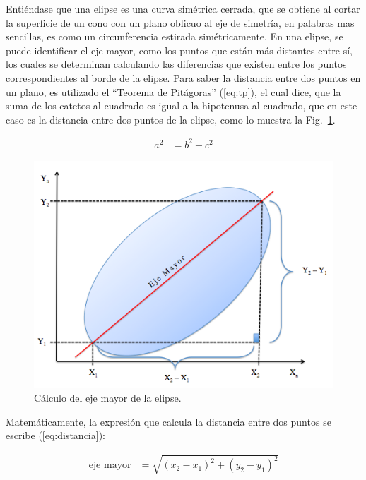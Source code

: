Entiéndase que una elipse es una curva simétrica cerrada, que se
obtiene al cortar la superficie de un cono con un plano oblicuo al eje
de simetría, en palabras mas sencillas, es como un circunferencia
estirada simétricamente. En una elipse, se puede identificar el eje
mayor, como los puntos que están más distantes entre sí, los cuales se
determinan calculando las diferencias que existen entre los puntos
correspondientes al borde de la elipse.  Para saber la distancia entre
dos puntos en un plano, es utilizado el ``Teorema de Pitágoras''
(\ref{eq:tp}), el cual dice, que la suma de los catetos al cuadrado es
igual a la hipotenusa al cuadrado, que en este caso es la distancia
entre dos puntos de la elipse, como lo muestra la Fig.~\ref{img:tp}.

\begin{align}
  a^2 & = b^2 + c^2 \label{eq:tp}
\end{align}

\begin{figure}[hb!]
  \begin{center}
    \includegraphics[scale=.5]{image/calculoEje}
  \end{center}
  \caption{Cálculo del eje mayor de la elipse.}\label{img:tp}
\end{figure}

Matemáticamente, la expresión que calcula la distancia entre dos
puntos se escribe (\ref{eq:distancia}):

\begin{align}
  \text{eje mayor} & = \sqrt{\left(x_2 - x_1\right)^2 + \left(y_2 -
  y_1\right)^2} \label{eq:distancia}
\end{align}

